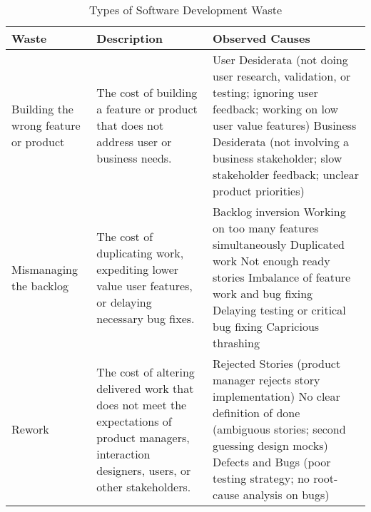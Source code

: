 \begin{table*}[t]
\renewcommand{\arraystretch}{1.3}
\centering
\caption{Types of Software Development Waste}
\label{Waste}
\begin{tabular}{|p{1.7in}|p{1.9in}|p{3in}|}
\hline
Waste  & Description & Observed Causes                                                                                                                                                                                                                                                                                                                                                                                                                     \\ \hline
Building the wrong feature or product &  The cost of building a feature or product that does not address user or business needs. & 
User Desiderata (not doing user research, validation, or testing; ignoring user feedback; working on low user value features) \newline Business Desiderata (not involving a business stakeholder; slow stakeholder feedback; unclear product priorities)                                                                                                                                                                                  \\ \hline
Mismanaging the backlog     & The cost of duplicating work, expediting lower value user features, or delaying necessary bug fixes.  & 
Backlog inversion \newline Working on too many features simultaneously \newline Duplicated work \newline Not enough ready stories  \newline Imbalance of feature work and bug fixing \newline Delaying testing or critical bug fixing \newline Capricious thrashing                                                                                                                                                                                                                                                                                                                                    \\ \hline
Rework                                & The cost of altering delivered work that does not meet the expectations of product managers, interaction designers, users, or other stakeholders. & Rejected Stories (product manager rejects story implementation) \newline No clear definition of done (ambiguous stories; second guessing design mocks) \newline Defects and Bugs (poor testing strategy; no root-cause analysis on bugs)                                                                                                                                                                   \\ \hline

\end{tabular}
\end{table*}
